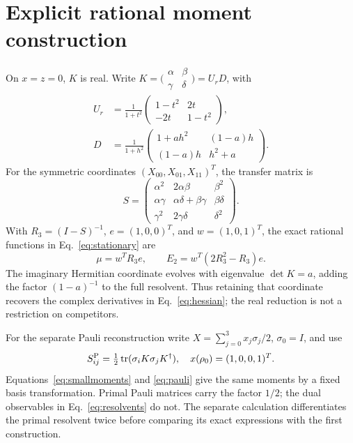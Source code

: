 \documentclass[aps,pra,reprint,amsmath,amssymb,longbibliography]{revtex4-2}
\newcommand{\tr}{\operatorname{tr}}
\begin{document}
\section{Explicit rational moment construction}\label{app:rational}
On $x=z=0$, $K$ is real. Write $K=\bigl(\begin{smallmatrix}\alpha&\beta\\\gamma&\delta\end{smallmatrix}\bigr)=U_rD$, with
\begin{align}
 U_r&=\frac{1}{1+t^2}\begin{pmatrix}1-t^2&2t\\-2t&1-t^2\end{pmatrix},\nonumber\\
 D&=\frac{1}{1+h^2}\begin{pmatrix}1+ah^2&(1-a)h\\(1-a)h&h^2+a\end{pmatrix}.
 \label{eq:realK}
\end{align}
For the symmetric coordinates $(X_{00},X_{01},X_{11})^T$, the transfer matrix is
\begin{equation}
 S=\begin{pmatrix}
 \alpha^2&2\alpha\beta&\beta^2\\
 \alpha\gamma&\alpha\delta+\beta\gamma&\beta\delta\\
 \gamma^2&2\gamma\delta&\delta^2
 \end{pmatrix}.\label{eq:symmetric}
\end{equation}
With $R_3=(I-S)^{-1}$, $e=(1,0,0)^T$, and $w=(1,0,1)^T$, the exact rational functions in Eq.~\eqref{eq:stationary} are
\begin{equation}
 \mu=w^TR_3e,\qquad E_2=w^T(2R_3^2-R_3)e.\label{eq:smallmoments}
\end{equation}
The imaginary Hermitian coordinate evolves with eigenvalue $\det K=a$, adding the factor $(1-a)^{-1}$ to the full resolvent. Thus retaining that coordinate recovers the complex derivatives in Eq.~\eqref{eq:hessian}; the real reduction is not a restriction on competitors.

For the separate Pauli reconstruction write $X=\sum_{j=0}^3x_j\sigma_j/2$, $\sigma_0=I$, and use
\begin{equation}
 S^{\rm P}_{ij}=\tfrac12\tr(\sigma_iK\sigma_jK^\dagger),\quad
 x(\rho_0)=(1,0,0,1)^T.\label{eq:pauli}
\end{equation}
Equations~\eqref{eq:smallmoments} and \eqref{eq:pauli} give the same moments by a fixed basis transformation. Primal Pauli matrices carry the factor $1/2$; the dual observables in Eq.~\eqref{eq:resolvents} do not. The separate calculation differentiates the primal resolvent twice before comparing its exact expressions with the first construction.


\end{document}
